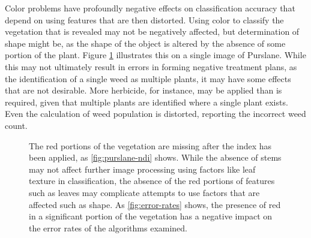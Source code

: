 \documentclass[letterpaper, notitlepage]{report}
\begin{document}
{Color problems have profoundly negative effects on classification accuracy that depend on using features that are then distorted. Using color to classify the vegetation that is revealed may not be negatively affected, but determination of shape might be, as the shape of the object is altered by the absence of some portion of the plant. Figure \ref{fig:segmentation-color-problem} illustrates this on a single image of Purslane. While this may not ultimately result in errors in forming negative treatment plans, as the identification of a single weed as multiple plants, it may have some effects that are not desirable. More herbicide, for instance, may be applied than is required, given that multiple plants are identified where a single plant exists. Even the calculation of weed population is distorted, reporting the incorrect weed count.


\begin{figure}[H]
	\centering
	\hfill
	\hfill
	\caption[Missing red portions of vegetation]{The red portions of the vegetation are missing after the index has been applied, as \ref{fig:purslane-ndi} shows. While the absence of stems may not affect further image processing using factors like leaf texture in classification, the absence of the red portions of features such as leaves may complicate attempts to use factors that are affected such as shape. As \ref{fig:error-rates} shows, the presence of red in a significant portion of the vegetation has a negative impact on the error rates of the algorithms examined.}
	\label{fig:segmentation-color-problem}
\end{figure}

}
\end{document}
